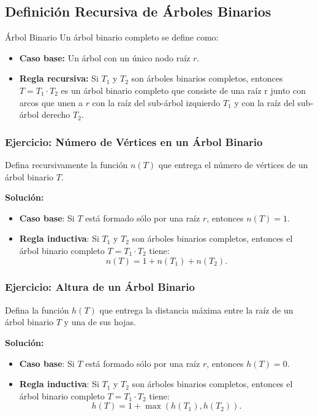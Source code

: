 \subsection{Definición Recursiva de Árboles Binarios}
\begin{exampleblock}{Árbol Binario}
Un árbol binario completo se define como:
\begin{itemize}
    \item \textbf{Caso base:} Un árbol con un único nodo raíz $r$.
    \item \textbf{Regla recursiva:} Si $T_1$ y $T_2$ son árboles binarios completos, entonces $T = T_1 \cdot T_2$ es un árbol binario completo que consiste de una raíz r junto con arcos que unen a $r$ con la raíz del sub-árbol izquierdo $T_1$ y con la raíz del sub-árbol derecho $T_2$.
\end{itemize}
\end{exampleblock}

\subsubsection{Ejercicio: Número de Vértices en un Árbol Binario}
Defina recursivamente la función $n(T)$ que entrega el número de vértices de un árbol binario $T$.

\textbf{Solución:}
\begin{itemize}
    \item \textbf{Caso base}: Si $T$ está formado sólo por una raíz $r$, entonces $n(T) = 1$.
    \item \textbf{Regla inductiva}: Si $T_1$ y $T_2$ son árboles binarios completos, entonces el árbol binario completo $T = T_1 \cdot T_2$ tiene:
    \[
        n(T) = 1 + n(T_1) + n(T_2).
    \]
\end{itemize}

\subsubsection{Ejercicio: Altura de un Árbol Binario}
Defina la función $h(T)$ que entrega la distancia máxima entre la raíz de un árbol binario $T$ y una de sus hojas.

\textbf{Solución:}
\begin{itemize}
    \item \textbf{Caso base}: Si $T$ está formado sólo por una raíz $r$, entonces $h(T) = 0$.
    \item \textbf{Regla inductiva}: Si $T_1$ y $T_2$ son árboles binarios completos, entonces el árbol binario completo $T = T_1 \cdot T_2$ tiene:
    \[
        h(T) = 1 + \max(h(T_1), h(T_2)).
    \]
\end{itemize}

